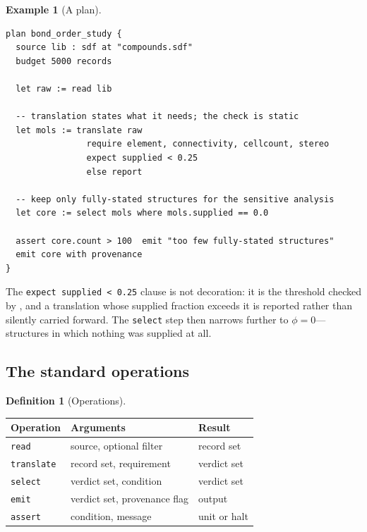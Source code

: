 \documentclass[11pt,twocolumn,a4paper]{article}
\theoremstyle{msthm}
\theoremstyle{definition}
\newtheorem{definition}[theorem]{Definition}
\newtheorem{example}[theorem]{Example}
\theoremstyle{remark}
\newcommand{\ms}[1]{\texttt{#1}}
\begin{document}
\begin{example}[A plan]
\label{ex:plan}
\begin{lstlisting}[caption={A plan that will not proceed on
convention-heavy input.}]
plan bond_order_study {
  source lib : sdf at "compounds.sdf"
  budget 5000 records

  let raw := read lib

  -- translation states what it needs; the check is static
  let mols := translate raw
                require element, connectivity, cellcount, stereo
                expect supplied < 0.25
                else report

  -- keep only fully-stated structures for the sensitive analysis
  let core := select mols where mols.supplied == 0.0

  assert core.count > 100  emit "too few fully-stated structures"
  emit core with provenance
}
\end{lstlisting}
The \ms{expect supplied < 0.25} clause is not decoration: it is the
threshold checked by , and a translation whose
supplied fraction exceeds it is reported rather than silently carried
forward. The \ms{select} step then narrows further to
$\phi=0$---structures in which nothing was supplied at all.
\end{example}

\subsection{The standard operations}
\label{sec:stdlib}

\begin{definition}[Operations]
\label{def:ops}
\hfill
\begin{center}
\small
\begin{tabular}{@{}lll@{}}
\toprule
Operation & Arguments & Result\\
\midrule
\ms{read} & source, optional filter & record set\\
\ms{translate} & record set, requirement & verdict set\\
\ms{select} & verdict set, condition & verdict set\\
\ms{emit} & verdict set, provenance flag & output\\
\ms{assert} & condition, message & unit or halt\\
\bottomrule
\end{tabular}
\end{center}
\end{definition}
\end{document}
